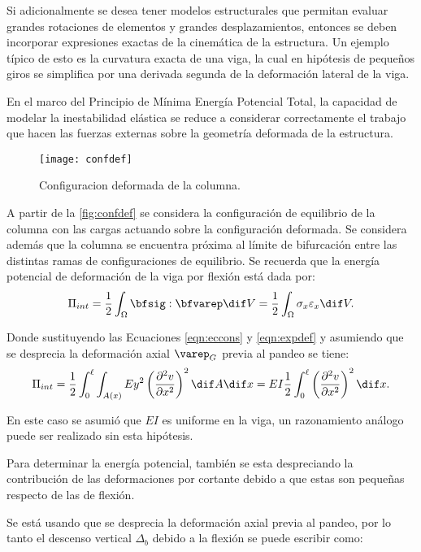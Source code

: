 Si adicionalmente se desea tener modelos estructurales que permitan evaluar grandes rotaciones de elementos y grandes desplazamientos, entonces se deben incorporar expresiones exactas de la cinemática de la estructura. Un ejemplo típico de esto es la curvatura exacta de una viga, la cual en hipótesis de pequeños giros se simplifica por una derivada segunda de la deformación lateral de la viga.

En el marco del Principio de Mínima Energía Potencial Total, la capacidad de modelar la inestabilidad elástica se reduce a considerar correctamente el trabajo que hacen las fuerzas externas sobre la geometría deformada de la estructura.


\begin{figure}[htb]
	\centering
	\texttt{[image: confdef]}
	\caption{Configuracion deformada de la columna.}
	\label{fig:confdef}
\end{figure}

A partir de la \autoref{fig:confdef} se considera la configuración de equilibrio de la columna con las cargas actuando sobre la configuración deformada. Se considera además que la columna se encuentra próxima al límite de bifurcación entre las distintas ramas de configuraciones de equilibrio.
Se recuerda que la energía potencial de deformación de la viga por flexión está dada por:
%
\begin{equation}
\Pi_{int} = \frac{1}{2} \int_\Omega \bfsig : \bfvarep  \dif V  = \frac{1}{2} \int_\Omega \sigma_x \varepsilon_x  \dif V. 
\end{equation}

Donde sustituyendo las Ecuaciones \eqref{eqn:eccons} y \eqref{eqn:expdef} y asumiendo que se desprecia la deformación axial $\varep_G$ previa al pandeo se tiene:
%
\begin{equation}
\Pi_{int} = \frac{1}{2} \int_0^\ell \int_{A(x)} E y^2 \left( \frac{\partial^2 v}{\partial x^2}\right)^2  \dif A \dif x 
=  E I  \frac{1}{2} \int_0^\ell \left( \frac{\partial^2 v}{\partial x^2}\right)^2 \dif x.
\end{equation}

En este caso se asumió que $EI$ es uniforme en la viga, un razonamiento análogo puede ser realizado sin esta hipótesis.

Para determinar la energía potencial, también se esta despreciando la contribución de las deformaciones por cortante debido a que estas son pequeñas respecto de las de flexión.

Se está usando que se desprecia la deformación axial previa al pandeo, por lo tanto el descenso vertical $\Delta_b$ debido a la flexión se puede escribir como:

